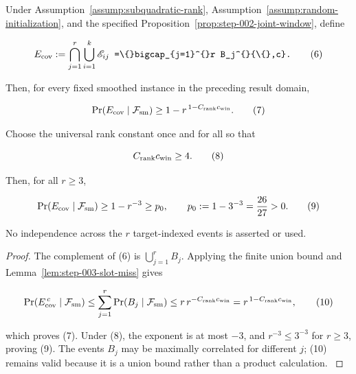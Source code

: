 \begin{proposition}\label{prop:step-003-coupon}
Under Assumption~\ref{assump:subquadratic-rank}, Assumption~\ref{assump:random-initialization},
and the specified Proposition~\ref{prop:step-002-joint-window}, define

\[
E_{\rm cov}:=\bigcap_{j=1}^r\bigcup_{i=1}^k\mathscr E_{ij}
\texttt{   =\textbackslash\{\}bigcap\_\{j=1\}\textasciicircum\{\}r B\_j\textasciicircum\{\}\{\textbackslash\{\},c\}.}
\tag{6}
\]

Then, for every fixed smoothed instance in the preceding result domain,

\[
\Pr(E_{\rm cov}\mid\mathcal F_{\rm sm})
\ge 1-r^{\,1-C_{\rm rank}c_{\rm win}}.
\tag{7}
\]

Choose the universal rank constant once and for all so that

\[
C_{\rm rank}c_{\rm win}\ge4.
\tag{8}
\]

Then, for all \(r\ge3\),

\[
\Pr(E_{\rm cov}\mid\mathcal F_{\rm sm})\ge1-r^{-3}\ge
p_0,\qquad p_0:=1-3^{-3}={26\over27}>0.
\tag{9}
\]

No independence across the \(r\) target-indexed events is asserted or used.

\begin{proof}
The complement of (6) is \(\bigcup_{j=1}^rB_j\). Applying the finite
union bound and Lemma~\ref{lem:step-003-slot-miss} gives

\[
\Pr(E_{\rm cov}^{\,c}\mid\mathcal F_{\rm sm})
\le\sum_{j=1}^r\Pr(B_j\mid\mathcal F_{\rm sm})
\le r\,r^{-C_{\rm rank}c_{\rm win}}
=r^{\,1-C_{\rm rank}c_{\rm win}},
\tag{10}
\]

which proves (7). Under (8), the exponent is at most \(-3\), and
\(r^{-3}\le3^{-3}\) for \(r\ge3\), proving (9). The events \(B_j\) may be
maximally correlated for different \(j\); (10) remains valid because it is a
union bound rather than a product calculation. \(\)


\end{proof}
\end{proposition}
